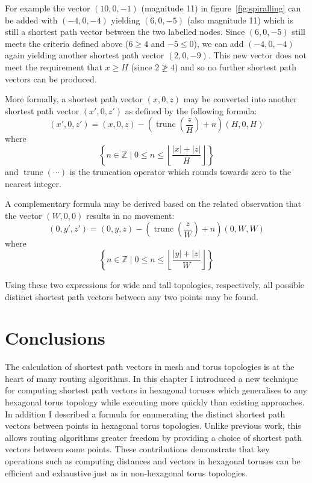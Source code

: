 			For example the vector $(10, 0, -1)$ (magnitude 11) in
			figure~\ref{fig:spiralling} can be added with $(-4, 0, -4)$ yielding $(6,
			0, -5)$ (also magnitude 11) which is still a shortest path vector between
			the two labelled nodes.  Since $(6, 0, -5)$ still meets the criteria
			defined above ($6 \ge 4$ and $-5 \le 0$), we can add $(-4, 0, -4)$ again
			yielding another shortest path vector $(2, 0, -9)$.  This new vector does
			not meet the requirement that $x \ge H$ (since $2 \ngeq 4$) and so no
			further shortest path vectors can be produced.
			
			More formally, a shortest path vector $(x, 0, z)$ may be converted into
			another shortest path vector $(x', 0, z')$ as defined by the following
			formula:
			\begin{equation*}
				(x', 0, z') = (x, 0, z) - \left(\operatorname{trunc}\left(\frac{z}{H}\right) + n\right)(H, 0, H)
			\end{equation*}
			where
			\begin{equation*}
				\left\{
					n \in \mathbb{Z}
				\;\Big|\;
					0 \le n \le
						\left\lfloor
							\frac{\left|x\right| + \left|z\right|}{H}
						\right\rfloor
				\right\}
			\end{equation*}
			and $\operatorname{trunc}(\cdots)$ is the truncation operator which
			rounds towards zero to the nearest integer.
			
			A complementary formula may be derived based on the related observation
			that the vector $(W, 0, 0)$ results in no movement:
			\begin{equation*}
				(0, y', z') = (0, y, z) - \left(\operatorname{trunc}\left(\frac{z}{W}\right) + n\right)(0, W, W)
			\end{equation*}
			where
			\begin{equation*}
				\left\{
					n \in \mathbb{Z}
				\;\Big|\;
					0 \le n \le
						\left\lfloor
							\frac{\left|y\right| + \left|z\right|}{W}
						\right\rfloor
				\right\}
			\end{equation*}
			
			Using these two expressions for wide and tall topologies, respectively,
			all possible distinct shortest path vectors between any two points may be
			found.
	
	\section{Conclusions}
		
		The calculation of shortest path vectors in mesh and torus topologies is at
		the heart of many routing algorithms. In this chapter I introduced a new
		technique for computing shortest path vectors in hexagonal toruses which
		generalises to any hexagonal torus topology while executing more quickly
		than existing approaches. In addition I described a formula for enumerating
		the distinct shortest path vectors between points in hexagonal torus
		topologies. Unlike previous work, this allows routing algorithms greater
		freedom by providing a choice of shortest path vectors between some points.
		These contributions demonstrate that key operations such as computing
		distances and vectors in hexagonal toruses can be efficient and exhaustive
		just as in non-hexagonal torus topologies.
